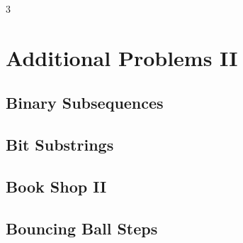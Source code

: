 \documentclass[8pt]{extarticle}
\begin{document}
\pagebreak
\begin{multicols*}{3}

\section{Additional Problems II}

\subsection{Binary Subsequences}
\begin{caixaenunciado}

\end{caixaenunciado}
\vspace{0.3cm}


\subsection{Bit Substrings}
\begin{caixaenunciado}

\end{caixaenunciado}
\vspace{0.3cm}


\subsection{Book Shop II}
\begin{caixaenunciado}

\end{caixaenunciado}
\vspace{0.3cm}


\subsection{Bouncing Ball Steps}
\begin{caixaenunciado}

\end{caixaenunciado}
\vspace{0.3cm}



\end{multicols*}
\end{document}
